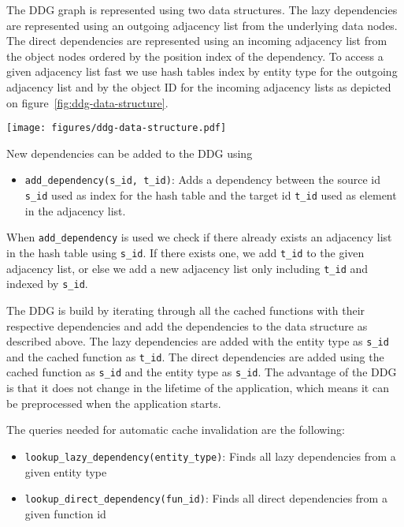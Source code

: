 The DDG graph is represented using two data structures. The lazy dependencies are represented using an outgoing adjacency list from the underlying data nodes. The direct dependencies are represented using an incoming adjacency list from the object nodes ordered by the position index of the dependency. To access a given adjacency list fast we use hash tables index by entity type for the outgoing adjacency list and by the object ID for the incoming adjacency lists as depicted on figure~\ref{fig:ddg-data-structure}.

\begin{figure*}[ht!]
  \centering
  \texttt{[image: figures/ddg-data-structure.pdf]}
  \caption{An illustration of the data structure representing the DDG on figure~\ref{fig:declaration-dependence-graph}}
  \label{fig:ddg-data-structure}
\end{figure*}

New dependencies can be added to the DDG using

\begin{itemize}
  \item \verb$add_dependency(s_id, t_id)$: Adds a dependency between the source id \verb$s_id$ used as index for the hash table and the target id \verb$t_id$ used as element in the adjacency list.
\end{itemize}

When \verb$add_dependency$ is used we check if there already exists an adjacency list in the hash table using \verb$s_id$. If there exists one, we add \verb$t_id$ to the given adjacency list, or else we add a new adjacency list only including \verb$t_id$ and indexed by \verb$s_id$.

The DDG is build by iterating through all the cached functions with their respective dependencies and add the dependencies to the data structure as described above. The lazy dependencies are added with the entity type as \verb$s_id$ and the cached function as \verb$t_id$. The direct dependencies are added using the cached function as \verb$s_id$ and the entity type as \verb$s_id$.  The advantage of the DDG is that it does not change in the lifetime of the application, which means it can be preprocessed when the application starts.

The queries needed for automatic cache invalidation are the following:

\begin{itemize}
  \item \verb$lookup_lazy_dependency(entity_type)$: Finds all lazy dependencies from a given entity type
  \item \verb$lookup_direct_dependency(fun_id)$: Finds all direct dependencies from a given function id
\end{itemize}

